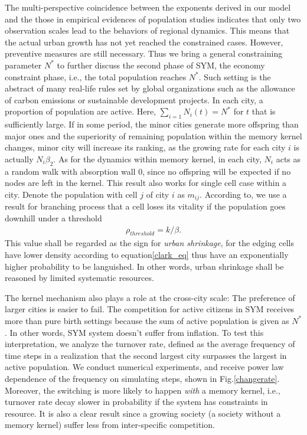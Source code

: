 \documentclass[reprint,unsortedaddress,amsmath,amssymb,aps,prl,showkeys]{revtex4-2}
\begin{document}
The multi-perspective coincidence between the exponents derived in our model and the those in empirical evidences of population studies indicates that only two observation scales lead to the behaviors of regional dynamics. This means that the actual urban growth has not yet reached the constrained cases. However, preventive measures are still necessary. Thus we bring a general constraining parameter $N^*$ to further discuss the second phase of SYM, the economy constraint phase, i.e., the total population reaches $N^*$. Such setting is the abstract of many real-life rules set by global organizations such as the allowance of carbon emissions or sustainable development projects. In each city, a proportion of population are active. Here, $\sum_{i=1} N_i(t) = N^*$ for $t$ that is sufficiently large. If in some period, the minor cities generate more offspring than major ones and the superiority of remaining population within the memory kernel changes, minor city will increase its ranking, as the growing rate for each city $i$ is actually $N_i\beta_2$. As for the dynamics within memory kernel, in each city, $N_i$ acts as a random walk with absorption wall $0$, since no offspring will be expected if no nodes are left in the kernel. This result also works for single cell case within a city. Denote the population with cell $j$ of city $i$ as $m_{ij}$. According to\@\cite{durrett1999essentials}, we use a result for branching process that a cell loses its vitality if the population goes downhill under a threshold \begin{align}\rho_{threshold} = k/\beta.\end{align} This value shall be regarded as the sign for \emph{urban shrinkage}, for the edging cells have lower density according to equation\@\ref{clark_eq} thus have an exponentially higher probability to be languished. In other words, urban shrinkage shall be reasoned by limited systematic resources. 

The kernel mechanism also plays a role at the cross-city scale: The preference of larger cities is easier to fail. The competition for active citizens in SYM receives more than pure birth settings because the sum of active population is given as $N^*$. In other words, SYM system doesn't suffer from inflation. To test this interpretation, we analyze the turnover rate, defined as the average frequency of time steps in a realization that the second largest city surpasses the largest in active population. We conduct numerical experiments, and receive power law dependence of the frequency on simulating steps, shown in Fig.\@\ref{changerate}. Moreover, the switching is more likely to happen \textit{with} a memory kernel, i.e., turnover rate decay slower in probability if the system has constraints in resource. It is also a clear result since a growing society (a society without a memory kernel) suffer less from inter-specific competition.
\end{document}
